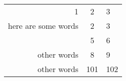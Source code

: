 \documentclass[11pt]{article}
\begin{document}
\begin{tabular}{r|c|l}
                  1 & 2   & 3   \\
here are some words & 2   & 3   \\
                    & 5   & 6   \\
       other words  & 8   & 9   \\
       other words  & 101 & 102 \\
\end{tabular}
\end{document}
